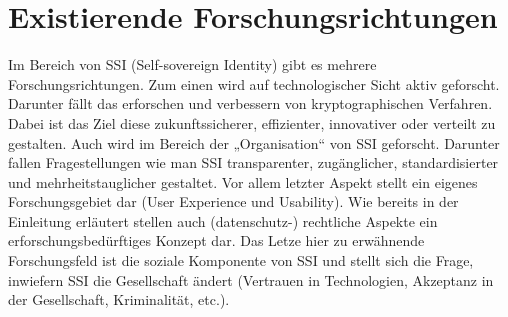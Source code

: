 \chapter{Existierende Forschungsrichtungen}
\label{cha:grundlagen}

Im Bereich von SSI (Self-sovereign Identity) gibt es mehrere Forschungsrichtungen. Zum einen wird auf technologischer Sicht aktiv geforscht. Darunter fällt das erforschen und verbessern von kryptographischen Verfahren. Dabei ist das Ziel diese zukunftssicherer, effizienter, innovativer oder verteilt zu gestalten. Auch wird im Bereich der „Organisation“ von SSI geforscht. Darunter fallen Fragestellungen wie man SSI transparenter, zugänglicher, standardisierter und mehrheitstauglicher gestaltet. Vor allem letzter Aspekt stellt ein eigenes Forschungsgebiet dar (User Experience und Usability). Wie bereits in der Einleitung erläutert stellen auch (datenschutz-) rechtliche Aspekte ein erforschungsbedürftiges Konzept dar. Das Letze hier zu erwähnende Forschungsfeld ist die soziale Komponente von SSI und stellt sich die Frage, inwiefern SSI die Gesellschaft ändert (Vertrauen in Technologien, Akzeptanz in der Gesellschaft, Kriminalität, etc.).